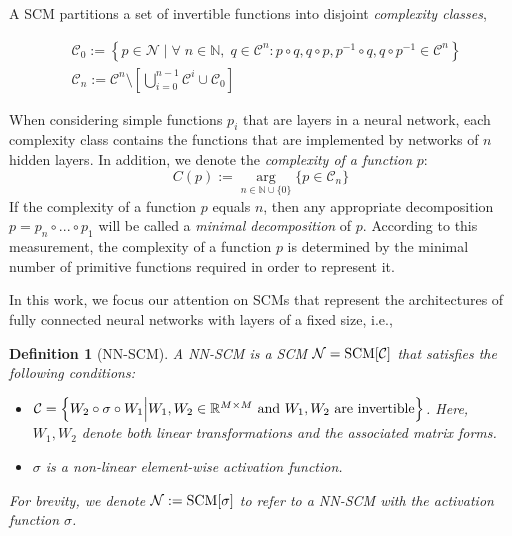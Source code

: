 \documentclass{article} %
\newtheorem{defn}{Definition}
\begin{document}
A SCM partitions a set of invertible functions into disjoint {\em complexity classes}, 
\begin{small}
\begin{equation}\label{eq:complex1}
\begin{aligned}
&\mathcal{C}_0 := \left\{p\in \mathcal{N} \;\Big\vert\; \forall \; n \in \mathbb{N}, \; q \in \mathcal{C}^n: p\circ q, q \circ p,p^{-1}\circ q, q \circ p^{-1} \in \mathcal{C}^n \right\} \\
&\mathcal{C}_n := 
\mathcal{C}^n \setminus \left[\bigcup^{n-1}_{i=0} \mathcal{C}^i \cup \mathcal{C}_0 \right]
\end{aligned}
\end{equation}
\end{small}
When considering simple functions $p_i$ that are layers in a neural network, each complexity class contains  the functions that are implemented by networks of $n$ hidden layers. In addition, we denote the {\em complexity of a function} $p$: 
\begin{equation}\label{eq:complex2}
C(p) := \underset{n \in \mathbb{N} \cup \{0\} }{\arg} \{ p \in \mathcal{C}_n \}
\end{equation}
If the complexity of a function $p$ equals $n$, then any appropriate decomposition $p=p_n \circ ... \circ p_1$ will be called a {\em minimal decomposition} of $p$. According to this measurement, the complexity of a function $p$ is determined by the minimal number of primitive functions required in order to represent it.


In this work, we focus our attention on SCMs that represent the architectures of fully connected neural networks with layers of a fixed size, i.e., 

\begin{defn}[NN-SCM] \label{def:nnscm}
A NN-SCM is a SCM $\mathcal{N}=\textnormal{SCM}[\mathcal{C}]$ that satisfies the following conditions: 
\begin{itemize}
\item $\mathcal{C} = \left\{W_2 \circ \sigma \circ W_1 \Big\vert W_1,W_2 \in \mathbb{R}^{M\times M} \textnormal{ and $W_1,W_2$ are invertible}\right\}$. Here, $W_1,W_2$ denote both linear transformations and the associated matrix forms.
\item $\sigma$ is a non-linear element-wise activation function.
\end{itemize}
For brevity, we denote $\mathcal{N} : =\textnormal{SCM}[\sigma]$ to refer to a NN-SCM with the activation function $\sigma$.
\end{defn}
\end{document}
